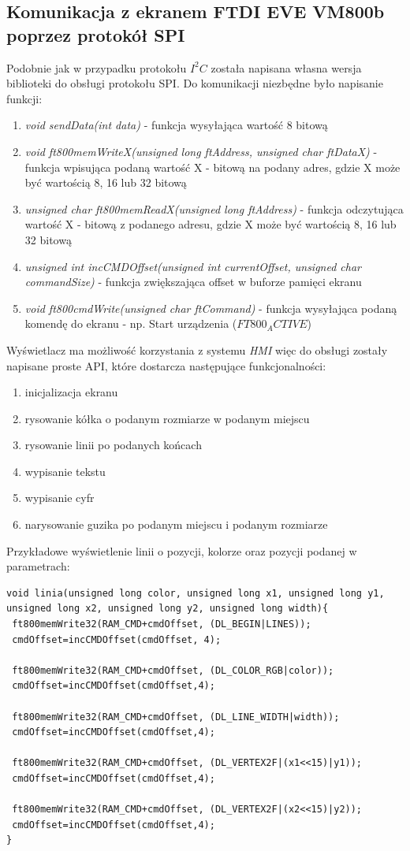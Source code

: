 \documentclass{xmgr}
\begin{document}
\subsection{Komunikacja z ekranem FTDI EVE VM800b poprzez protokół SPI}
Podobnie jak w przypadku protokołu $I^2C$ została napisana własna wersja biblioteki do obsługi protokołu SPI. Do komunikacji niezbędne było napisanie funkcji:
\begin{enumerate}
	\item \emph{void sendData(int data)} - funkcja wysyłająca wartość 8 bitową
	\item \emph{void ft800memWriteX(unsigned long ftAddress, unsigned char ftDataX)} - funkcja wpisująca podaną wartość X - bitową na podany adres, gdzie X może być wartością 8, 16 lub 32 bitową
	\item \emph{unsigned char ft800memReadX(unsigned long ftAddress)} - funkcja odczytująca wartość X - bitową z podanego adresu, gdzie X może być wartością 8, 16 lub 32 bitową
	\item \emph{unsigned int incCMDOffset(unsigned int currentOffset, unsigned char commandSize)} - funkcja zwiększająca offset w buforze pamięci ekranu
	\item \emph{void ft800cmdWrite(unsigned char ftCommand)} - funkcja wysyłająca podaną komendę do ekranu - np. Start urządzenia ($FT800_ACTIVE$)
\end{enumerate}

Wyświetlacz ma możliwość korzystania z systemu \emph{HMI} więc do obsługi zostały napisane proste API, które dostarcza następujące funkcjonalności:
 \begin{enumerate}
	\item inicjalizacja ekranu
	\item rysowanie kółka o podanym rozmiarze w podanym miejscu
	\item rysowanie linii po podanych końcach
	\item wypisanie tekstu
	\item wypisanie cyfr
	\item narysowanie guzika po podanym miejscu i podanym rozmiarze
\end{enumerate}

Przykładowe wyświetlenie linii o pozycji, kolorze oraz pozycji podanej w parametrach:
\begin{lstlisting}[label=bot-dirs-alg,caption=Narysowanie linii na ekranie]
void linia(unsigned long color, unsigned long x1, unsigned long y1, 
unsigned long x2, unsigned long y2, unsigned long width){
 ft800memWrite32(RAM_CMD+cmdOffset, (DL_BEGIN|LINES));
 cmdOffset=incCMDOffset(cmdOffset, 4);
 
 ft800memWrite32(RAM_CMD+cmdOffset, (DL_COLOR_RGB|color));
 cmdOffset=incCMDOffset(cmdOffset,4);

 ft800memWrite32(RAM_CMD+cmdOffset, (DL_LINE_WIDTH|width));
 cmdOffset=incCMDOffset(cmdOffset,4);

 ft800memWrite32(RAM_CMD+cmdOffset, (DL_VERTEX2F|(x1<<15)|y1));
 cmdOffset=incCMDOffset(cmdOffset,4);
  
 ft800memWrite32(RAM_CMD+cmdOffset, (DL_VERTEX2F|(x2<<15)|y2));
 cmdOffset=incCMDOffset(cmdOffset,4);	
}
\end{lstlisting}
\end{document}
